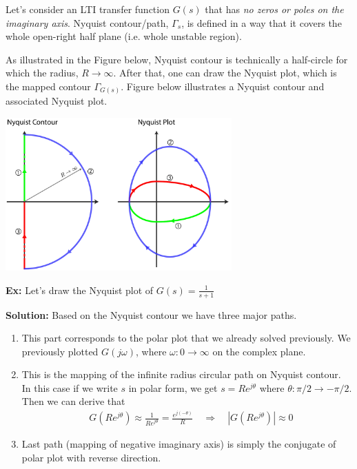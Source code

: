 \documentclass{article}
\begin{document}
\vspace{6 pt}

Let's consider an LTI transfer function $G(s)$ that 
has \textit{no zeros or poles on the imaginary axis}. Nyquist contour/path, 
$\Gamma_s$, is defined in a way that it covers the
whole open-right half plane (i.e. whole unstable region). 

As illustrated in the Figure below, 
Nyquist contour is technically a half-circle for which the radius, $R
\to \infty$. After that, one can draw the Nyquist plot, which is the
mapped contour $\Gamma_{G(s)}$. Figure below illustrates a Nyquist
contour and associated Nyquist plot. 

\vspace{6 pt}

  \begin{minipage}[h]{1\linewidth}
    \begin{center}
      \includegraphics[width=0.65\textwidth]{figs/nyq}
    \end{center}
  \end{minipage}

\newpage

\textbf{Ex:} Let's draw the Nyquist plot of $G(s) = \frac{1}{s+1}$ 

\textbf{Solution:}  Based on the Nyquist contour we have three major
paths. 
%
\begin{enumerate}
  \item This part corresponds to the polar plot that we already solved previously. We previously 
  plotted $G(j \omega)$, where $\omega : 0 \to \infty$ on the complex plane.
%
  \item This is the mapping of the infinite radius circular path on
    Nyquist contour. In this case if we write $s$ in polar form, we get 
   $s = R e^{j \theta}$ where $\theta : \pi/2 \to -\pi/2$.  Then 
   we can derive that  
   \begin{align*}
     & G \left( R e^{j \theta} \right)  \approx \frac{1}{R e^{j
       \theta}} = \frac{e^{j (-\theta)}}{R}
       \quad  \Rightarrow \quad | G \left( R e^{j \theta} \right) | \approx 0
   \end{align*}
   \item Last path (mapping of negative imaginary axis) is simply 
    the conjugate of polar plot with reverse direction. 
\end{enumerate}
\end{document}
